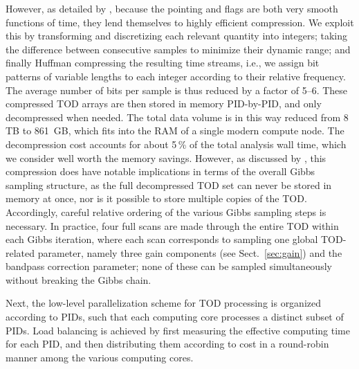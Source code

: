 \documentclass[onecolumn]{aa}
\begin{document}
However, as detailed by \citet{bp03}, because the pointing and flags
are both very smooth functions of time, they lend themselves to highly
efficient compression. We exploit this by transforming and
discretizing each relevant quantity into integers; taking the
difference between consecutive samples to minimize their dynamic
range; and finally Huffman compressing \citep{huffman:1952} the
resulting time streams, i.e., we assign bit patterns of variable
lengths to each integer according to their relative frequency. The
average number of bits per sample is thus reduced by a factor of
5--6. These compressed TOD arrays are then stored in memory
PID-by-PID, and only decompressed when needed. The total data volume
is in this way reduced from 8\,TB to 861~GB, which fits into the RAM
of a single modern compute node. The decompression cost accounts for
about 5\,\% of the total analysis wall time, which we consider well
worth the memory savings. However, as discussed by \citet{bp03}, this
compression does have notable implications in terms of the overall
Gibbs sampling structure, as the full decompressed TOD set can never
be stored in memory at once, nor is it possible to store multiple
copies of the TOD. Accordingly, careful relative ordering of the
various Gibbs sampling steps is necessary. In practice, four full
scans are made through the entire TOD within each Gibbs iteration,
where each scan corresponds to sampling one global TOD-related
parameter, namely three gain components (see
Sect.~\ref{sec:gain}) and the bandpass correction parameter; none of
these can be sampled simultaneously without breaking the Gibbs chain.

Next, the low-level parallelization scheme for TOD processing is
organized according to PIDs, such that each computing core processes a
distinct subset of PIDs. Load balancing is achieved by first measuring
the effective computing time for each PID, and then distributing them
according to cost in a round-robin manner among the various computing
cores.
\end{document}
